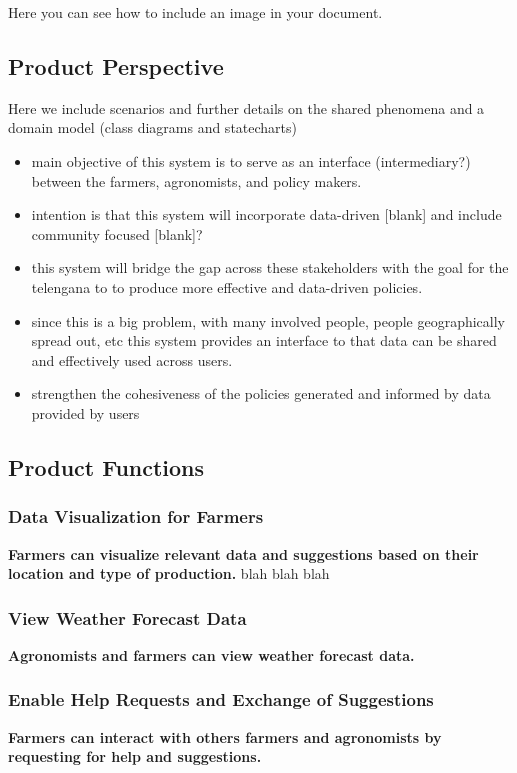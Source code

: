 Here you can see how to include an image in your document.

\subsection{Product Perspective}
Here we include scenarios and further details on the shared phenomena and a domain model (class diagrams and statecharts)


\begin{itemize}
\item
main objective of this system is to serve as an interface (intermediary?) between the farmers, agronomists, and policy makers. 
\item
intention is that this system will incorporate data-driven [blank] and include community focused [blank]? 
\item
this system will bridge the gap across these stakeholders with the goal for the telengana to to produce more effective and data-driven policies.
\item
since this is a big problem, with many involved people, people geographically spread out, etc this system provides an interface to that data can be shared and effectively used across users. 
\item
strengthen the cohesiveness of the policies generated and informed by data provided by users
\end{itemize}


\subsection{Product Functions}

\subsubsection{Data Visualization for Farmers}
\textbf{Farmers can visualize relevant data and suggestions based on their location and type of production.}
blah blah blah
\subsubsection{View Weather Forecast Data}
\textbf{Agronomists and farmers can view weather forecast data.}
\subsubsection{Enable Help Requests and Exchange of Suggestions}
\textbf{Farmers can interact with others farmers and agronomists by requesting for help and suggestions.}
